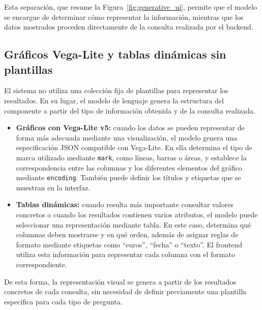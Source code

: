 Esta separación, que resume la Figura~\ref{fig:generative_ui}, permite que el
modelo se encargue de determinar cómo representar la información, mientras que
los datos mostrados proceden directamente de la consulta realizada por el
backend.



\subsection{Gráficos Vega-Lite y tablas dinámicas sin plantillas}

El sistema no utiliza una colección fija de plantillas para representar los
resultados. En su lugar, el modelo de lenguaje genera la estructura del
componente a partir del tipo de información obtenida y de la consulta realizada.

\begin{itemize}

    \item \textbf{Gráficos con Vega-Lite v5:} cuando los datos se pueden
    representar de forma más adecuada mediante una visualización, el modelo
    genera una especificación JSON compatible con Vega-Lite. En ella determina
    el tipo de marca utilizado mediante \texttt{mark}, como líneas, barras o
    áreas, y establece la correspondencia entre las columnas y los diferentes
    elementos del gráfico mediante \texttt{encoding}. También puede definir
    los títulos y etiquetas que se muestran en la interfaz.

    \item \textbf{Tablas dinámicas:} cuando resulta más importante consultar
    valores concretos o cuando los resultados contienen varios atributos, el
    modelo puede seleccionar una representación mediante tabla. En este caso,
    determina qué columnas deben mostrarse y en qué orden, además de asignar
    reglas de formato mediante etiquetas como ``euros'', ``fecha'' o ``texto''.
    El frontend utiliza esta información para representar cada columna con el
    formato correspondiente.

\end{itemize}

De esta forma, la representación visual se genera a partir de los resultados
concretos de cada consulta, sin necesidad de definir previamente una plantilla
específica para cada tipo de pregunta.